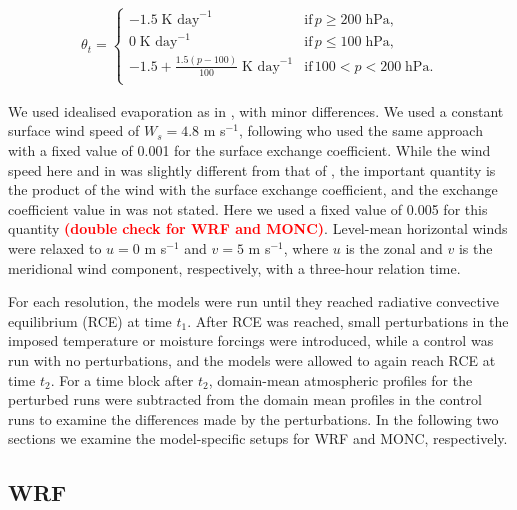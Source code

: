 \documentclass[draft]{agujournal2019}
\newcommand{\todo}[1]{\textcolor{red}{\textbf{(#1)}}}
\begin{document}
\begin{align}
 \theta_t = \begin{cases}
    -1.5\; \textrm{K day}^{-1} & \textrm{if}\, p \geq 200\; \textrm{hPa}, \\
    0\; \textrm{K day}^{-1} & \textrm{if}\, p \leq 100\; \textrm{hPa}, \\
    -1.5 + \frac{1.5 (p-100)}{100}\; \textrm{K day}^{-1} & \textrm{if}\, 100 < p < 200\; \textrm{hPa}. \\
 \end{cases}
\end{align}

We used idealised evaporation as in , with minor
differences. We used a constant surface wind speed of $W_s = 4.8$ m s$^{-1}$,
following  who used the same approach with a fixed value
of 0.001 for the surface exchange coefficient. While the wind speed here and in
 was slightly different from that of
, the important quantity is the product of the wind with
the surface exchange coefficient, and the exchange coefficient value in
 was not stated. Here we used a fixed value of 0.005 for
this quantity \todo{double check for WRF and MONC}. Level-mean horizontal winds
were relaxed to $u = 0$ m s$^{-1}$ and $v = 5$ m s$^{-1}$, where $u$ is the
zonal and $v$ is the meridional wind component, respectively, with a three-hour
relation time.

For each resolution, the models were run until they reached radiative convective
equilibrium (RCE) at time $t_1$. After RCE was reached, small perturbations in
the imposed temperature or moisture forcings were introduced, while a control
was run with no perturbations, and the models were allowed to again reach RCE at
time $t_2$. For a time block after $t_2$, domain-mean atmospheric profiles for
the perturbed runs were subtracted from the domain mean profiles in the control
runs to examine the differences made by the perturbations. In the following two
sections we examine the model-specific setups for WRF and MONC, respectively.

\subsection{WRF}
\end{document}
